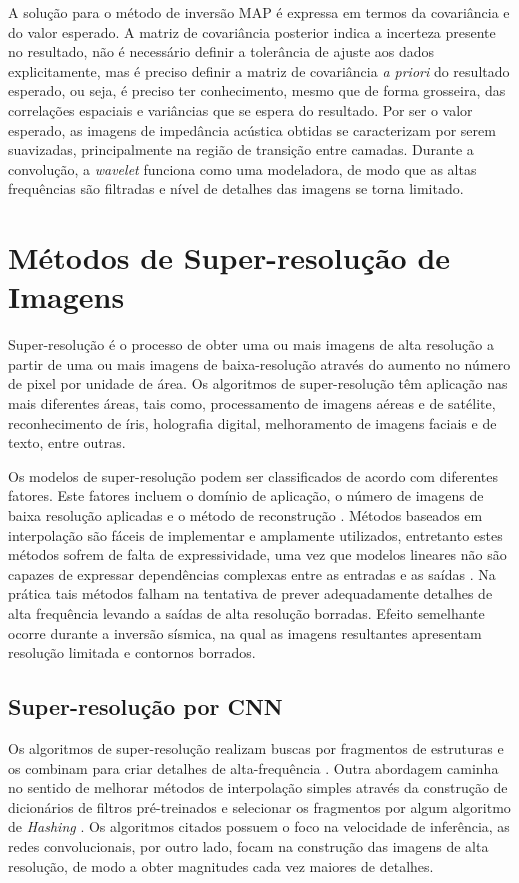 {A solução para o método de inversão MAP é expressa em termos da covariância
e do valor esperado. 
A matriz de covariância posterior indica a incerteza presente no resultado, não é necessário
definir a tolerância de ajuste aos dados explicitamente, mas é preciso definir a
matriz de covariância \textit{a priori} do resultado esperado, ou seja, é
preciso ter conhecimento, mesmo que de forma grosseira, das correlações espaciais e
variâncias que se espera do resultado.
Por ser o valor esperado, as imagens de impedância acústica obtidas
se caracterizam por serem suavizadas, principalmente na região de
transição entre camadas. Durante a convolução, a \textit{wavelet} funciona
como uma modeladora, de modo que as altas frequências são filtradas
e nível de detalhes das imagens se torna limitado. 

\section{Métodos de Super-resolução de Imagens}
Super-resolução é o processo de obter uma ou mais imagens de alta
resolução a partir de uma ou mais imagens de baixa-resolução
através do aumento no número de pixel por unidade de área.
Os algoritmos de super-resolução têm aplicação nas mais diferentes áreas,
tais como, processamento de imagens aéreas e de satélite, reconhecimento de
íris, holografia digital, melhoramento de imagens faciais e de texto, entre
outras.

Os modelos de super-resolução podem ser classificados
de acordo com diferentes fatores. Este fatores incluem o domínio de aplicação,
o número de imagens de baixa resolução aplicadas e o método de reconstrução \cite{Nasrollahi2014}.
Métodos baseados em interpolação são fáceis de implementar e amplamente utilizados,
entretanto estes métodos sofrem de falta de expressividade, uma vez que modelos lineares
não são capazes de expressar dependências complexas entre as entradas e as saídas \citep{HsiehAndrews1978}.
Na prática tais métodos falham na tentativa de prever adequadamente detalhes de alta frequência
levando a saídas de alta resolução borradas. Efeito semelhante ocorre durante a inversão sísmica,
na qual as imagens resultantes apresentam resolução limitada e contornos borrados.

\subsection{Super-resolução por CNN}

Os algoritmos de super-resolução realizam buscas por
fragmentos de estruturas e os combinam para criar detalhes
de alta-frequência \citep{Freeman2002,Huang2015}. Outra abordagem caminha no sentido
de melhorar métodos de interpolação simples através da construção
de dicionários de filtros pré-treinados e selecionar os fragmentos
por algum algoritmo de \textit{Hashing} \citep{Romano2017}. Os algoritmos citados
possuem o foco na velocidade de inferência, as redes convolucionais, por outro lado,
focam na construção das imagens de alta resolução, de modo a obter magnitudes
cada vez maiores de detalhes.

}

